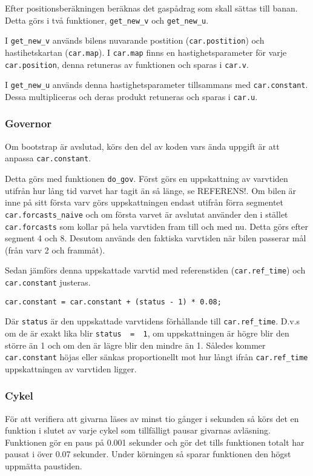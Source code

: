 Efter positionsberäkningen beräknas det gaspådrag som skall sättas till banan. Detta görs i två
funktioner, \texttt{get\_new\_v} och \texttt{get\_new\_u}.
 
I \texttt{get\_new\_v} används bilens nuvarande postition (\texttt{car.postition})
och hastihetskartan (\texttt{car.map}). I \texttt{car.map} finns en
hastighetsparameter för varje \texttt{car.position}, denna retuneras av funktionen
och sparas i \texttt{car.v}.
 
I \texttt{get\_new\_u} används denna hastighetsparameter tillsammans med
\texttt{car.constant}. Dessa multipliceras och deras produkt retuneras och sparas
i \texttt{car.u}.

\subsubsection{Governor}
\label{sec:systembeskrivning:governor}
Om bootstrap är avslutad, körs den del av koden vars ända uppgift är att 
anpassa \texttt{car.constant}. 

Detta görs med funktionen \texttt{do\_gov}.  Först görs en uppskattning av 
varvtiden utifrån hur lång tid varvet har tagit än
så länge, se REFERENS!. Om bilen är inne på sitt första varv görs uppskattningen endast
utifrån förra segmentet \texttt{car.forcasts\_naive} och om första varvet är
avslutat använder den i stället \texttt{car.forcasts} som kollar på hela varvtiden
fram till och med nu. Detta görs efter segment 4 och 8. Desutom används den
faktiska varvtiden när bilen passerar mål (från varv 2 och frammåt).
 
Sedan jämförs denna uppskattade varvtid med referenstiden (\texttt{car.ref\_time}) 
och \texttt{car.constant} justeras.
\begin{verbatim}
car.constant = car.constant + (status - 1) * 0.08;
\end{verbatim}
Där \texttt{status} är den uppskattade varvtidens förhållande till \texttt{car.ref\_time}.
D.v.s om de är exakt lika blir \texttt{status~ =~ 1}, om uppskattningen är högre blir
den större än 1 och om den är lägre blir den mindre än 1. Således kommer \texttt{car.constant}
höjas eller sänkas proportionellt mot hur långt ifrån \texttt{car.ref\_time} uppskattningen
av varvtiden ligger. 

\subsubsection{Cykel}
\label{sec:system:korning:cykel}
För att verifiera att givarna läses av minst tio gånger i sekunden så körs det
en funktion i slutet av varje cykel som tillfälligt pausar givarnas avläsning.
Funktionen gör en paus på 0.001 sekunder och gör det tills funktionen totalt har
pausat i över 0.07 sekunder. Under körningen så sparar funktionen den högst
uppmätta paustiden.